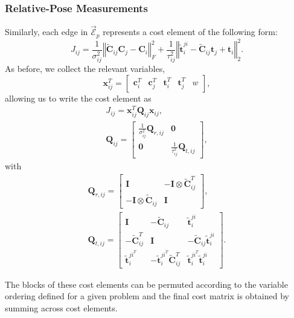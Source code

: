 \documentclass[lettersize,journal]{IEEEtran}
\newcommand{\EdgeSet}{\vec{\bm{\mathcal{E}}}}
\begin{document}
{\subsubsection{Relative-Pose Measurements}

Similarly, each edge in $\EdgeSet_p$ represents a cost element of the following form:
\begin{equation}
	J_{ij} = \frac{1}{\sigma^2_{ij}} \left\Vert \tilde{\bm{C}}_{ij}\bm{C}_j - \bm{C}_i\right\Vert_F^2 + \frac{1}{\tau^2_{ij}} \left\Vert \tilde{\bm{t}}^{ji}_{i} - \tilde{\bm{C}}_{ij}\bm{t}_j + \bm{t}_i \right\Vert_2^2.
\end{equation}
As before, we collect the relevant variables,
\begin{equation*}
	\bm{x}_{ij}^T = \begin{bmatrix} \bm{c}_i^T&\bm{c}_j^T  & \bm{t}_i^T & \bm{t}_j^T & w\end{bmatrix},
\end{equation*}
allowing us to write the cost element as
\begin{gather*}
	J_{ij}= \bm{x}_{ij}^T\bm{Q}_{ij}\bm{x}_{ij}, \\
	\bm{Q}_{ij} = \begin{bmatrix}
		\frac{1}{\sigma^2_{ij}}\bm{Q}_{r,ij} & \bm{0}\\
		\bm{0}&\frac{1}{\tau^2_{ij}}\bm{Q}_{t,ij}
	\end{bmatrix},
\end{gather*}
with
\begin{gather*}
	\bm{Q}_{r,ij}=\begin{bmatrix}
		\bm{I}  &  -\bm{I}\otimes\tilde{\bm{C}}_{ij}^T\\
		-\bm{I}\otimes\tilde{\bm{C}}_{ij} & \bm{I}
	\end{bmatrix}, \\ 
	\bm{Q}_{t,ij}=\begin{bmatrix}
		\bm{I}  &  -\tilde{\bm{C}}_{ij} & \tilde{\bm{t}}_{i}^{ji}\\
		-\tilde{\bm{C}}_{ij}^T & \bm{I} & -\tilde{\bm{C}}_{ij}\tilde{\bm{t}}_{i}^{ji}\\
		\tilde{\bm{t}}_{i}^{ji^T} &  -\tilde{\bm{t}}_{i}^{ji^T}\tilde{\bm{C}}_{ij}^T & \tilde{\bm{t}}_{i}^{ji^T} \tilde{\bm{t}}_{i}^{ji}
	\end{bmatrix}.
\end{gather*}

The blocks of these cost elements can be permuted according to the variable ordering defined for a given problem and the final cost matrix is obtained by summing across cost elements.
}
\end{document}
